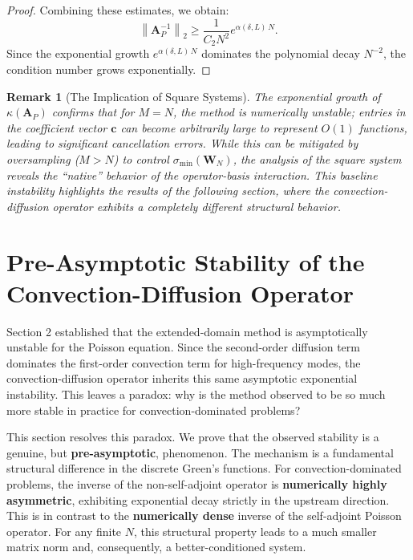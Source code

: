 \documentclass[pdflatex,sn-mathphys-num]{sn-jnl}%
\theoremstyle{thmstyleone}%
\newtheorem{remark}{Remark}
\newcommand{\norm}[1]{\left\lVert#1\right\rVert}
\newcommand{\mat}[1]{\mathbf{#1}}
\newcommand{\vect}[1]{\mathbf{#1}}
\begin{document}
\begin{proof}
Combining these estimates, we obtain:
\begin{equation}
\norm{\mat{A}_P^{-1}}_2 \ge \frac{1}{C_2 N^2} e^{\alpha(\delta, L)\, N}.
\end{equation}
Since the exponential growth $e^{\alpha(\delta, L)\, N}$ dominates the polynomial decay $N^{-2}$, the condition number grows exponentially.
\end{proof}

\begin{remark}[The Implication of Square Systems]
The exponential growth of $\kappa(\mat{A}_P)$ confirms that for $M=N$, the method is numerically unstable; entries in the coefficient vector $\vect{c}$ can become arbitrarily large to represent $O(1)$ functions, leading to significant cancellation errors. While this can be mitigated by oversampling ($M > N$) to control $\sigma_{\min}(\mat{W}_N)$, the analysis of the square system reveals the ``native'' behavior of the operator-basis interaction. This baseline instability highlights the results of the following section, where the convection-diffusion operator exhibits a completely different structural behavior.
\end{remark}

\section{Pre-Asymptotic Stability of the Convection-Diffusion Operator}

Section 2 established that the extended-domain method is asymptotically unstable for the Poisson equation. Since the second-order diffusion term dominates the first-order convection term for high-frequency modes, the convection-diffusion operator inherits this same asymptotic exponential instability. This leaves a paradox: why is the method observed to be so much more stable in practice for convection-dominated problems?

This section resolves this paradox. We prove that the observed stability is a genuine, but \textbf{pre-asymptotic}, phenomenon. The mechanism is a fundamental structural difference in the discrete Green's functions. For convection-dominated problems, the inverse of the non-self-adjoint operator is \textbf{numerically highly asymmetric}, exhibiting exponential decay strictly in the upstream direction. This is in contrast to the \textbf{numerically dense} inverse of the self-adjoint Poisson operator. For any finite $N$, this structural property leads to a much smaller matrix norm and, consequently, a better-conditioned system.
\end{document}
